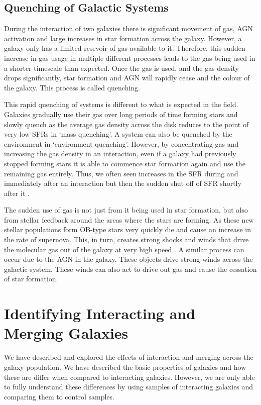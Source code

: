\subsection{Quenching of Galactic Systems}
\noindent During the interaction of two galaxies there is significant movement of gas, AGN activation and large increases in star formation across the galaxy. However, a galaxy only has a limited resevoir of gas available to it. Therefore, this sudden increase in gas usage in multiple different processes leads to the gas being used in a shorter timescale than expected. Once the gas is used, and the gas density drops significantly, star formation and AGN will rapidly cease and the colour of the galaxy. This process is called quenching.

This rapid quenching of systems is different to what is expected in the field. Galaxies gradually use their gas over long periods of time forming stars and slowly quench as the average gas density across the disk reduces to the point of very low SFRs \citep{2010ApJ...721..193P} in `mass quenching'. A system can also be quenched by the environment in `environment quenching'. However, by concentrating gas and increasing the gas density in an interaction, even if a galaxy had previously stopped forming stars it is able to commence star formation again and use the remaining gas entirely. Thus, we often seen increases in the SFR during and immediately after an interaction but then the sudden shut off of SFR shortly after it \citep{2022MNRAS.517L..92E}. 

The sudden use of gas is not just from it being used in star formation, but also from stellar feedback around the areas where the stars are forming. As these new stellar populations form OB-type stars very quickly die and cause an increase in the rate of supernova. This, in turn, creates strong shocks and winds that drive the molecular gas out of the galaxy at very high speed \citep{2013Natur.499..450B, 2018ApJ...864L...1G}. A similar process can occur due to the AGN in the galaxy. These objects  drive strong winds across the galactic system. These winds can also act to drive out gas \citep{2014A&A...562A..21C,  	2016Natur.533..504C, 2018MNRAS.480.3993B} and cause the cessation of star formation.

\section{Identifying Interacting and Merging Galaxies}
\noindent We have described and explored the effects of interaction and merging across the galaxy population. We have described the basic properties of galaxies and how these are differ when compared to interacting galaxies. However, we are only able to fully understand these differences by using samples of interacting galaxies and comparing them to control samples.

